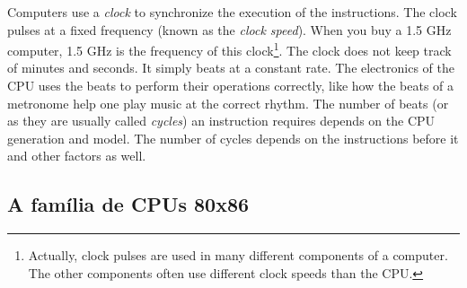 Computers use a \emph{clock}  to synchronize the
execution of the  instructions.  The clock pulses at a fixed frequency
(known as the \emph{clock speed}). When you buy a 1.5 GHz computer,
1.5 GHz is the frequency of this clock\footnote{Actually, clock pulses
are used in many different components of a computer. The other
components often use different clock speeds than the CPU.}. The clock
does not keep track of minutes and seconds. It simply beats at a
constant rate. The electronics of the CPU uses the beats to perform
their operations correctly, like how the beats of a metronome help one
play music at the correct rhythm.  The number of beats (or as they are
usually called \emph{cycles}) an instruction requires depends on the
CPU generation and model. The number of cycles depends on the
instructions before it and other factors as well.


\subsection{A família de CPUs 80x86}

